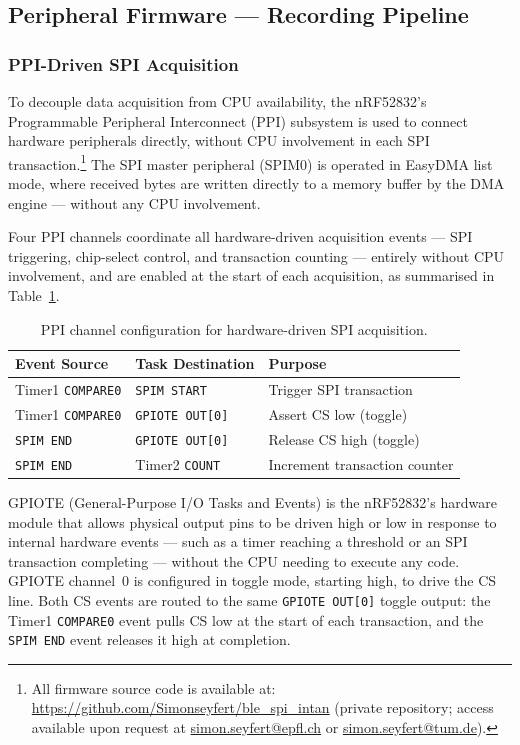 \subsection{Peripheral Firmware --- Recording Pipeline}
\subsubsection{PPI-Driven SPI Acquisition}
\label{sec:ppi_acquisition}

To decouple data acquisition from CPU availability, the nRF52832's Programmable
Peripheral Interconnect (PPI) subsystem is used to connect hardware peripherals
directly, without CPU involvement in each SPI transaction.\footnote{All firmware source code is available at:
\url{https://github.com/Simonseyfert/ble_spi_intan} (private repository;
access available upon request at \href{mailto:simon.seyfert@epfl.ch}{simon.seyfert@epfl.ch}
or \href{mailto:simon.seyfert@tum.de}{simon.seyfert@tum.de}).}
The SPI master peripheral (SPIM0) is operated in EasyDMA list mode, where received
bytes are written directly to a memory buffer by the DMA engine --- without any
CPU involvement.

Four PPI channels coordinate all hardware-driven acquisition events --- SPI
triggering, chip-select control, and transaction counting --- entirely without CPU
involvement, and are enabled at the start of each acquisition, as summarised in
Table~\ref{tab:ppi_channels}.

\begin{table}[htbp]
\centering
\caption{PPI channel configuration for hardware-driven SPI acquisition.}
\label{tab:ppi_channels}
\begin{tabular}{lll}
\toprule
\textbf{Event Source}    & \textbf{Task Destination}  & \textbf{Purpose} \\
\midrule
Timer1 \texttt{COMPARE0} & \texttt{SPIM START}        & Trigger SPI transaction \\
Timer1 \texttt{COMPARE0} & \texttt{GPIOTE OUT[0]}     & Assert CS low (toggle) \\
\texttt{SPIM END}        & \texttt{GPIOTE OUT[0]}     & Release CS high (toggle) \\
\texttt{SPIM END}        & Timer2 \texttt{COUNT}      & Increment transaction counter \\
\bottomrule
\end{tabular}
\end{table}

GPIOTE (General-Purpose I/O Tasks and Events) is the nRF52832's hardware module
that allows physical output pins to be driven high or low in response to internal
hardware events --- such as a timer reaching a threshold or an SPI transaction
completing --- without the CPU needing to execute any code.
GPIOTE channel~0 is configured in toggle mode, starting high, to drive the CS line.
Both CS events are routed to the same \texttt{GPIOTE OUT[0]} toggle output: the
Timer1 \texttt{COMPARE0} event pulls CS low at the start of each transaction, and
the \texttt{SPIM END} event releases it high at completion.

